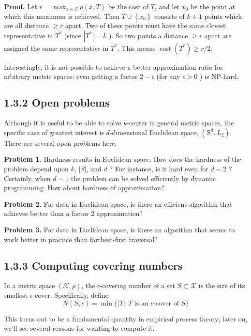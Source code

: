 \documentclass{article}
\begin{document}
\textbf{Proof.} Let $r=\max _{x \in S} \rho(x, T)$ be the cost of $T$, and let $x_{0}$ be the point at which this maximum is achieved. Then $T \cup\left\{x_{0}\right\}$ consists of $k+1$ points which are all distance $\geq r$ apart. Two of these points must have the same closest representative in $T^{*}$ (since $\left|T^{*}\right|=k$ ). So two points a distance $\geq r$ apart are assigned the same representative in $T^{*}$. This means $\operatorname{cost}\left(T^{*}\right) \geq r / 2$.

Interestingly, it is not possible to achieve a better approximation ratio for arbitrary metric spaces: even getting a factor $2-\epsilon$ (for any $\epsilon>0$ ) is NP-hard.

\subsection*{1.3.2 Open problems}

Although it is useful to be able to solve $k$-center in general metric spaces, the specific case of greatest interest is $d$-dimensional Euclidean space, $(\mathbb{R}^{d}, L_{2})$. There are several open problems here.

\textbf{Problem 1.} Hardness results in Euclidean space. How does the hardness of the problem depend upon $k$, $|S|$, and $d$ ? For instance, is it hard even for $d=2$ ? Certainly, when $d=1$ the problem can be solved efficiently by dynamic programming. How about hardness of approximation?

\textbf{Problem 2.} For data in Euclidean space, is there an efficient algorithm that achieves better than a factor 2 approximation?

\textbf{Problem 3.} For data in Euclidean space, is there an algorithm that seems to work better in practice than farthest-first traversal?

\subsection*{1.3.3 Computing covering numbers}

In a metric space $(\mathcal{X}, \rho)$, the $\epsilon$-covering number of a set $S \subset \mathcal{X}$ is the size of its smallest $\epsilon$-cover. Specifically, define
\begin{equation*}
N(S, \epsilon)=\min \{|T|: T \text{ is an } \epsilon \text{-cover of } S\}
\end{equation*}

This turns out to be a fundamental quantity in empirical process theory; later on, we'll see several reasons for wanting to compute it.
\end{document}
